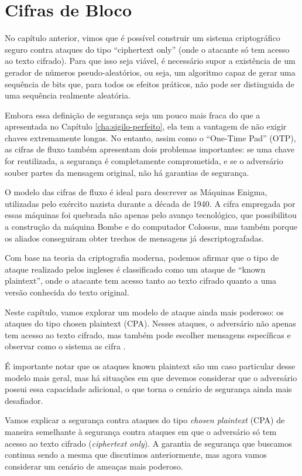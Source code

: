 \chapter{Cifras de Bloco}
\label{cha:cifras-de-bloco}

No capítulo anterior, vimos que é possível construir um sistema criptográfico seguro contra ataques do tipo ``ciphertext only'' (onde o atacante só tem acesso ao texto cifrado).
Para que isso seja viável, é necessário supor a existência de um gerador de números pseudo-aleatórios, ou seja, um algoritmo capaz de gerar uma sequência de bits que, para todos os efeitos práticos, não pode ser distinguida de uma sequência realmente aleatória.

Embora essa definição de segurança seja um pouco mais fraca do que a apresentada no Capítulo \ref{cha:sigilo-perfeito}, ela tem a vantagem de não exigir chaves extremamente longas.
No entanto, assim como o ``One-Time Pad'' (OTP), as cifras de fluxo também apresentam dois problemas importantes:
se uma chave for reutilizada, a segurança é completamente comprometida, e se o adversário souber partes da mensagem original, não há garantias de segurança.

O modelo das cifras de fluxo é ideal para descrever as Máquinas Enigma, utilizadas pelo exército nazista durante a década de 1940.
A cifra empregada por essas máquinas foi quebrada não apenas pelo avanço tecnológico, que possibilitou a construção da máquina Bombe e do computador Colossus, mas também porque os aliados conseguiram obter trechos de mensagens já descriptografadas.

Com base na teoria da criptografia moderna, podemos afirmar que o tipo de ataque realizado pelos ingleses é classificado como um ataque de ``known plaintext'', onde o atacante tem acesso tanto ao texto cifrado quanto a uma versão conhecida do texto original.

Neste capítulo, vamos explorar um modelo de ataque ainda mais poderoso: os ataques do tipo chosen plaintext (CPA). Nesses ataques, o adversário não apenas tem acesso ao texto cifrado, mas também pode escolher mensagens específicas e observar como o sistema as cifra \cite{Bellare97}.

É importante notar que os ataques known plaintext são um caso particular desse modelo mais geral, mas há situações em que devemos considerar que o adversário possui essa capacidade adicional, o que torna o cenário de segurança ainda mais desafiador.


Vamos explicar a segurança contra ataques do tipo \textit{chosen plaintext} (CPA) de maneira semelhante à segurança contra ataques em que o adversário só tem acesso ao texto cifrado (\textit{ciphertext only}). A garantia de segurança que buscamos continua sendo a mesma que discutimos anteriormente, mas agora vamos considerar um cenário de ameaças mais poderoso.

